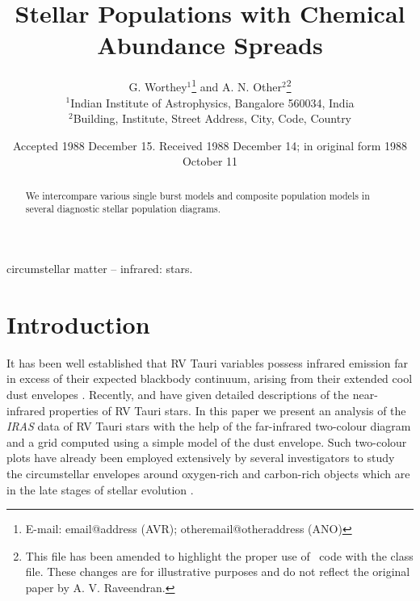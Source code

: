 \documentclass[useAMS,usenatbib]{mn2e}
\title[Stellar Populations with Chemical Abundance Spreads]{Stellar Populations with Chemical Abundance Spreads}
\author[G. Worthey et al.]{G. Worthey$^{1}$\thanks{E-mail:
email@address (AVR); otheremail@otheraddress (ANO)} and A. N.
Other$^{2}$\footnotemark[1]\thanks{This file has been amended to
highlight the proper use of \LaTeXe\ code with the class file.
These changes are for illustrative purposes and do not reflect the
original paper by A. V. Raveendran.}\\
$^{1}$Indian Institute of Astrophysics, Bangalore 560034, India\\
$^{2}$Building, Institute, Street Address, City, Code, Country}
\begin{document}
\date{Accepted 1988 December 15. Received 1988 December 14; in original form 1988 October 11}

\pagerange{\pageref{firstpage}--\pageref{lastpage}} 

\maketitle

\label{firstpage}

\begin{abstract}

We intercompare various single burst models and composite population
models in several diagnostic stellar population diagrams.

\end{abstract}

\begin{keywords}
circumstellar matter -- infrared: stars.
\end{keywords}

\section{Introduction}

It has been well established that RV Tauri variables  possess
infrared emission far in excess of their expected  blackbody
continuum, arising from their extended cool dust envelopes
\citep{b7,b5,b6}. Recently, \citet{b15} and \citet{b9} have given
detailed descriptions of the near-infrared properties of RV Tauri
stars. In this paper we present an analysis of the {\it IRAS\/}
data of RV Tauri stars with the help of the far-infrared
two-colour diagram and a grid computed using a simple model of the
dust envelope. Such two-colour plots have already been employed
extensively by several investigators to study the circumstellar
envelopes around oxygen-rich and carbon-rich objects which are in
the late stages of stellar evolution \citep{b10,b25,b23,b24}.
\end{document}
